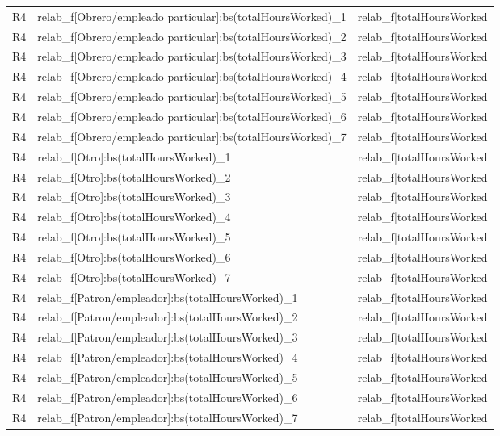 \begin{longtable}{lll}
R4 & relab\_f[Obrero/empleado particular]:bs(totalHoursWorked)\_1 & relab\_f|totalHoursWorked \\
R4 & relab\_f[Obrero/empleado particular]:bs(totalHoursWorked)\_2 & relab\_f|totalHoursWorked \\
R4 & relab\_f[Obrero/empleado particular]:bs(totalHoursWorked)\_3 & relab\_f|totalHoursWorked \\
R4 & relab\_f[Obrero/empleado particular]:bs(totalHoursWorked)\_4 & relab\_f|totalHoursWorked \\
R4 & relab\_f[Obrero/empleado particular]:bs(totalHoursWorked)\_5 & relab\_f|totalHoursWorked \\
R4 & relab\_f[Obrero/empleado particular]:bs(totalHoursWorked)\_6 & relab\_f|totalHoursWorked \\
R4 & relab\_f[Obrero/empleado particular]:bs(totalHoursWorked)\_7 & relab\_f|totalHoursWorked \\
R4 & relab\_f[Otro]:bs(totalHoursWorked)\_1 & relab\_f|totalHoursWorked \\
R4 & relab\_f[Otro]:bs(totalHoursWorked)\_2 & relab\_f|totalHoursWorked \\
R4 & relab\_f[Otro]:bs(totalHoursWorked)\_3 & relab\_f|totalHoursWorked \\
R4 & relab\_f[Otro]:bs(totalHoursWorked)\_4 & relab\_f|totalHoursWorked \\
R4 & relab\_f[Otro]:bs(totalHoursWorked)\_5 & relab\_f|totalHoursWorked \\
R4 & relab\_f[Otro]:bs(totalHoursWorked)\_6 & relab\_f|totalHoursWorked \\
R4 & relab\_f[Otro]:bs(totalHoursWorked)\_7 & relab\_f|totalHoursWorked \\
R4 & relab\_f[Patron/empleador]:bs(totalHoursWorked)\_1 & relab\_f|totalHoursWorked \\
R4 & relab\_f[Patron/empleador]:bs(totalHoursWorked)\_2 & relab\_f|totalHoursWorked \\
R4 & relab\_f[Patron/empleador]:bs(totalHoursWorked)\_3 & relab\_f|totalHoursWorked \\
R4 & relab\_f[Patron/empleador]:bs(totalHoursWorked)\_4 & relab\_f|totalHoursWorked \\
R4 & relab\_f[Patron/empleador]:bs(totalHoursWorked)\_5 & relab\_f|totalHoursWorked \\
R4 & relab\_f[Patron/empleador]:bs(totalHoursWorked)\_6 & relab\_f|totalHoursWorked \\
R4 & relab\_f[Patron/empleador]:bs(totalHoursWorked)\_7 & relab\_f|totalHoursWorked \\

\end{longtable}
